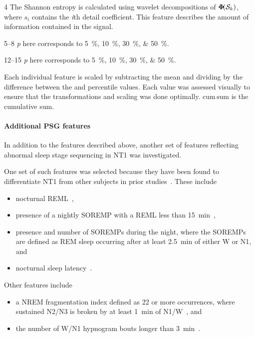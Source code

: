 \begin{table}[t]
\begin{adjustwidth*}{}{}
\begin{threeparttable}
\begin{tabular}{@{}llc@{}}
        \bottomrule
    \end{tabular}
    \begin{tablenotes}
        \small
        \item[4] The Shannon entropy is calculated using wavelet decompositions of \( \boldsymbol{\Phi} \! \! \left( \mathcal{S}_{k} \right) \), where \(s_i\) contains the \textit{i}th detail coefficient. This feature describes the amount of information contained in the signal.
        \item[5--8] \textit{p} here corresponds to \SIlist{5;10;30;50}{\percent}. 
        \item[12--15] \textit{p} here corresponds to \SIlist{5;10;30;50}{\percent}. 
        \item Each individual feature is scaled by subtracting the mean and dividing by the difference between the  and  percentile values.
        Each value was assessed visually to ensure that the transformations and scaling was done optimally.
        \( \mathrm{cum \, sum} \) is the cumulative sum.
    \end{tablenotes}
\end{threeparttable}
\end{adjustwidth*}
\end{table}

\paragraph{Additional \ac{PSG} features}
In addition to the features described above, another set of features reflecting abnormal sleep stage sequencing in \ac{NT1} was investigated.

One set of such features was selected because they have been found to differentiate \ac{NT1} from other subjects in prior studies~\cite{Christensen2015a,Roth2013,Hansen2017,Drakatos2013,Liu2015b}. 
These include
\begin{itemize}
    \item nocturnal \ac{REML}~\cite{Andlauer2013},
    \item presence of a nightly \ac{SOREMP} with a \ac{REML} less than \SI{15}{\minute}~\cite{Andlauer2013},
    \item presence and number of \acp{SOREMP} during the night, where the \acp{SOREMP} are defined as \ac{REM} sleep occurring after at least \SI{2.5}{\minute} of either \ac{W} or \ac{N1}, and
    \item nocturnal sleep latency~\cite{Christensen2015a}.
\end{itemize}
Other features include 
\begin{itemize}
    \item a \ac{NREM} fragmentation index defined as 22 or more occurrences, where sustained \ac{N2}/\ac{N3} is broken by at least \SI{1}{\minute} of \ac{N1}/\ac{W}~\cite{Christensen2015a}, and
    \item the number of \ac{W}/\ac{N1} hypnogram bouts longer than \SI{3}{\minute}~\cite{Christensen2015a}.
\end{itemize}

